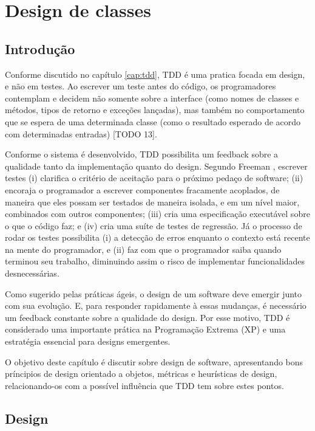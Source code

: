 \chapter{Design de classes}
\label{cap:design}

\section{Introdução}
\label{sec:design-introducao}

Conforme discutido no capítulo \ref{cap:tdd}, TDD é uma pratica focada em design, e não em testes.
Ao escrever um teste antes do código, os programadores contemplam e decidem não somente sobre a interface (como nomes de classes e 
métodos, tipos de retorno e exceções lançadas), mas também no comportamento que se espera de uma determinada classe 
(como o resultado esperado de acordo com determinadas entradas) [TODO 13].

Conforme o sistema é desenvolvido, TDD possibilita um feedback sobre a qualidade tanto da implementação quanto do design. Segundo 
Freeman \cite{GOOS}, escrever testes (i) clarifica o critério de aceitação para o próximo pedaço de software; (ii) encoraja o programador
a escrever componentes fracamente acoplados, de maneira que eles possam ser testados de maneira isolada, e em um nível maior, combinados
com outros componentes; (iii) cria uma especificação executável sobre o que o código faz; e (iv) cria uma suíte de testes de regressão.
Já o processo de rodar os testes possibilita (i) a detecção de erros enquanto o contexto está recente na mente do programador, e (ii)
faz com que o programador saiba quando terminou seu trabalho, diminuindo assim o risco de implementar funcionalidades desnecessárias.

Como sugerido pelas práticas ágeis,
o design de um software deve emergir junto com sua evolução. E, para responder rapidamente à essas mudanças, é necessário
um feedback constante sobre a qualidade do design. Por esse motivo, TDD é considerado uma importante prática na Programação 
Extrema (XP) \cite{XPExplained} e uma estratégia essencial para designs emergentes.

O objetivo deste capítulo é discutir sobre design de software, apresentando
bons príncipios de design orientado a objetos, métricas e heurísticas de design, relacionando-os com a possível influência 
que TDD tem sobre estes pontos.

\section{Design}


